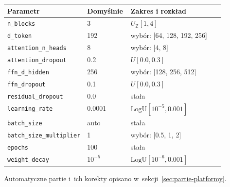 \par\medskip\noindent\begin{minipage}{\linewidth}\captionsetup{hypcap=false}\centering\footnotesize
{}
\begin{tabularx}{\linewidth}{@{}P{0.32\linewidth}P{0.20\linewidth}Y@{}}
\toprule Parametr & Domyślnie & Zakres i rozkład \\
\midrule
\texttt{n\_blocks} & 3 & $U_{\mathbb Z}[1, 4]$ \\
\texttt{d\_token} & 192 & wybór: [64, 128, 192, 256] \\
\texttt{attention\_n\_heads} & 8 & wybór: [4, 8] \\
\texttt{attention\_dropout} & 0.2 & $U[0.0, 0.3]$ \\
\texttt{ffn\_d\_hidden} & 256 & wybór: [128, 256, 512] \\
\texttt{ffn\_dropout} & 0.1 & $U[0.0, 0.3]$ \\
\texttt{residual\_dropout} & 0.0 & stała \\
\texttt{learning\_rate} & 0.0001 & $\mathrm{LogU}[10^{-5}, 0.001]$ \\
\texttt{batch\_size} & auto & stała \\
\texttt{batch\_size\_multiplier} & 1 & wybór: [0.5, 1, 2] \\
\texttt{epochs} & 100 & stała \\
\texttt{weight\_decay} & $10^{-5}$ & $\mathrm{LogU}[10^{-6}, 0.001]$ \\
\bottomrule\end{tabularx}\end{minipage}\par\medskip

Automatyczne partie i~ich korekty opisano w~sekcji~\ref{sec:partie-platformy}.

